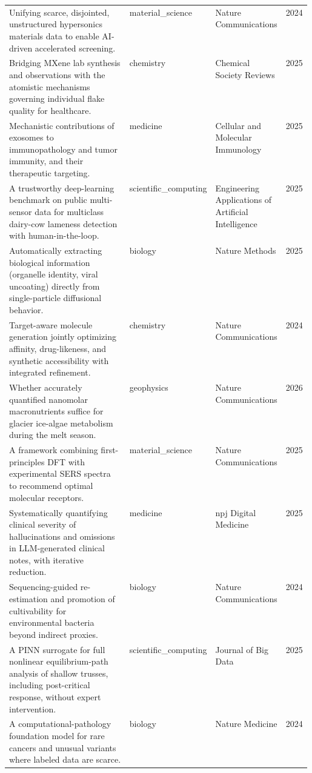 \begin{landscape}
\begin{longtable}{@{}p{0.58\linewidth} l l c@{}}
\addlinespace
Unifying scarce, disjointed, unstructured hypersonics materials data to enable AI-driven accelerated screening. & material\_science & Nature Communications & 2024 \\
\addlinespace
Bridging MXene lab synthesis and observations with the atomistic mechanisms governing individual flake quality for healthcare. & chemistry & Chemical Society Reviews & 2025 \\
\addlinespace
Mechanistic contributions of exosomes to immunopathology and tumor immunity, and their therapeutic targeting. & medicine & Cellular and Molecular Immunology & 2025 \\
\addlinespace
A trustworthy deep-learning benchmark on public multi-sensor data for multiclass dairy-cow lameness detection with human-in-the-loop. & scientific\_computing & Engineering Applications of Artificial Intelligence & 2025 \\
\addlinespace
Automatically extracting biological information (organelle identity, viral uncoating) directly from single-particle diffusional behavior. & biology & Nature Methods & 2025 \\
\addlinespace
Target-aware molecule generation jointly optimizing affinity, drug-likeness, and synthetic accessibility with integrated refinement. & chemistry & Nature Communications & 2024 \\
\addlinespace
Whether accurately quantified nanomolar macronutrients suffice for glacier ice-algae metabolism during the melt season. & geophysics & Nature Communications & 2026 \\
\addlinespace
A framework combining first-principles DFT with experimental SERS spectra to recommend optimal molecular receptors. & material\_science & Nature Communications & 2025 \\
\addlinespace
Systematically quantifying clinical severity of hallucinations and omissions in LLM-generated clinical notes, with iterative reduction. & medicine & npj Digital Medicine & 2025 \\
\addlinespace
Sequencing-guided re-estimation and promotion of cultivability for environmental bacteria beyond indirect proxies. & biology & Nature Communications & 2024 \\
\addlinespace
A PINN surrogate for full nonlinear equilibrium-path analysis of shallow trusses, including post-critical response, without expert intervention. & scientific\_computing & Journal of Big Data & 2025 \\
\addlinespace
A computational-pathology foundation model for rare cancers and unusual variants where labeled data are scarce. & biology & Nature Medicine & 2024 \\

\end{longtable}
\end{landscape}
